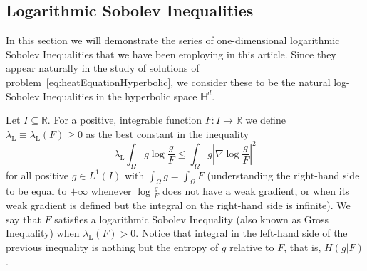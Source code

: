 \documentclass[12pt,longbibliography]{article}
\def\R{\mathbb{R}}
\def\:{\colon}
\def\R{\mathbb{R}}
\def\H{\mathbb{H}}
\def\:{\colon}
\def\lambdaL{\lambda_{\mathrm{L}}}
\def\lambdaP{\lambda_{\mathrm{P}}}
\theoremstyle{definition}
\theoremstyle{remark}
\theoremstyle{example}
\begin{document}
\subsection{Logarithmic Sobolev Inequalities}\label{sect:sobolev}

In this section we will demonstrate the series of one-dimensional logarithmic Sobolev Inequalities that we have been employing in this article. Since they appear naturally in the study of solutions of problem~\eqref{eq:heatEquationHyperbolic}, we consider these to be the natural log-Sobolev Inequalities in the hyperbolic space $\H^d$.

Let $I\subseteq \R$. For a positive, integrable function
$F \: I \to \R$ we define $\lambdaL \equiv \lambdaL(F) \geq 0$ as the best constant in the
inequality
\begin{equation*}
	\lambdaL \int_{\Omega}g
	\log\frac{g}{F}\leq \int_{\Omega}g\left|\nabla
	\log\frac{g}{F}\right|^2
\end{equation*}
for all positive $g \in L^1(I)$ with
$\int_\Omega g = \int_\Omega F$ (understanding the right-hand side to
be equal to $+\infty$ whenever $\log \frac{g}{F}$ does not have a weak
gradient, or when its weak gradient is defined but the integral on the
right-hand side is infinite). We say that $F$ satisfies a logarithmic
Sobolev Inequality (also known as Gross Inequality) when $\lambdaL(F) > 0$. Notice that integral in the left-hand side of the previous inequality is nothing but the entropy of $g$ relative to $F$, that is, $H(g|F)$.

\end{document}
